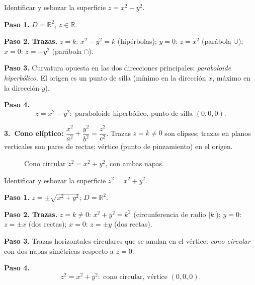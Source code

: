\begin{example}
Identificar y esbozar la superficie $z = x^2 - y^2$.
\begin{myproof}
\textbf{Paso 1.} $D=\mathbb{R}^2$, $z\in\mathbb{R}$.

\textbf{Paso 2. Trazas.}
$z=k$: $x^2-y^2=k$ (hipérbolas);
$y=0$: $z=x^2$ (parábola $\cup$);
$x=0$: $z=-y^2$ (parábola $\cap$).

\textbf{Paso 3.} Curvatura opuesta en las dos direcciones principales:
\emph{paraboloide hiperbólico}. El origen es un punto de silla (mínimo
en la dirección $x$, máximo en la dirección $y$).

\textbf{Paso 4.}
\[\boxed{z=x^2-y^2:\;\text{paraboloide hiperbólico, punto de silla }(0,0,0).}\]
\end{myproof}
\end{example}

\medskip
\noindent\textbf{3.\ Cono elíptico:}
$\dfrac{x^2}{a^2}+\dfrac{y^2}{b^2}=\dfrac{z^2}{c^2}$.
Trazas $z=k\ne0$ son elipses; trazas en planos verticales son pares de
rectas; vértice (punto de pinzamiento) en el origen.

\begin{figure}[!htbp]
\centering
{}
\caption{Cono circular $z^2=x^2+y^2$, con ambas napas.}
\label{fig:cono_circular}
\end{figure}

\begin{example}
Identificar y esbozar la superficie $z^2 = x^2 + y^2$.
\begin{myproof}
\textbf{Paso 1.} $z=\pm\sqrt{x^2+y^2}$; $D=\mathbb{R}^2$.

\textbf{Paso 2. Trazas.}
$z=k\ne0$: $x^2+y^2=k^2$ (circunferencia de radio $|k|$);
$y=0$: $z=\pm x$ (dos rectas);
$x=0$: $z=\pm y$ (dos rectas).

\textbf{Paso 3.} Trazas horizontales circulares que se anulan en el
vértice: \emph{cono circular} con dos napas simétricas respecto a $z=0$.

\textbf{Paso 4.}
\[\boxed{z^2=x^2+y^2:\;\text{cono circular, vértice }(0,0,0).}\]
\end{myproof}
\end{example}

